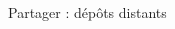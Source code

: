 \documentclass[table,tikz,12pt,svgnames]{beamer}
\begin{document}
\begin{frame}{Partager : dépôts distants}
\begin{adjustwidth}{-0.75cm}{0cm}{}
\vspace{-1em}
	\begin{center}
	\end{center}
\end{adjustwidth}
\end{frame}



\end{document}
